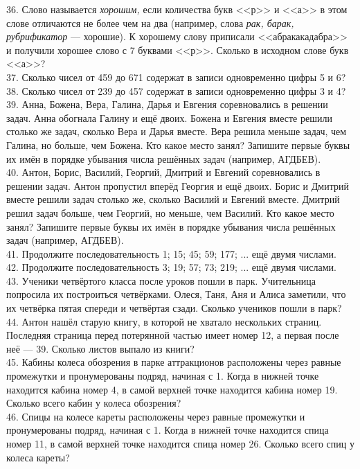 \documentclass[12pt]{article}
\begin{document}
36. Слово называется {\it хорошим,} если количества букв <<р>> и <<а>> в этом слове отличаются не более чем на два (например, слова {\it рак, барак, рубрификатор} --- хорошие). К хорошему слову приписали <<абракакадабра>> и получили хорошее слово с 7 буквами <<р>>. Сколько в исходном слове букв <<а>>?\\
37. Сколько чисел от 459 до 671 содержат в записи одновременно цифры 5 и 6?\\
38. Сколько чисел от 239 до 457 содержат в записи одновременно цифры 3 и 4?\\
39. Анна, Божена, Вера, Галина, Дарья и Евгения соревновались в решении задач. Анна обогнала Галину и ещё двоих. Божена и Евгения вместе решили столько же задач, сколько Вера и Дарья вместе. Вера решила меньше задач, чем Галина, но больше, чем Божена. Кто какое место занял? Запишите первые буквы их имён в порядке убывания числа решённых задач (например, АГДБЕВ).\\
40. Антон, Борис, Василий, Георгий, Дмитрий и Евгений соревновались в решении задач. Антон пропустил вперёд Георгия и ещё двоих. Борис и Дмитрий вместе решили задач столько же, сколько Василий и Евгений вместе. Дмитрий решил задач больше, чем Георгий, но меньше, чем Василий. Кто какое место занял? Запишите первые буквы их имён в порядке убывания числа решённых задач (например, АГДБЕВ).\\
41. Продолжите последовательность 1; 15; 45; 59; 177; ... ещё двумя числами.\\
42. Продолжите последовательность 3; 19; 57; 73; 219; ... ещё двумя числами.\\
43. Ученики четвёртого класса после уроков пошли в парк. Учительница попросила их построиться четвёрками. Олеся, Таня, Аня и Алиса заметили, что их четвёрка пятая спереди и четвёртая сзади. Сколько учеников пошли в парк?\\
44. Антон нашёл старую книгу, в которой не хватало нескольких страниц. Последняя страница перед потерянной частью имеет номер 12, а первая после неё --- 39. Сколько листов выпало из книги?\\
45. Кабины колеса обозрения в парке аттракционов расположены через равные промежутки и пронумерованы подряд, начиная с 1. Когда в нижней точке находится кабина номер 4, в самой верхней точке находится кабина номер 19. Сколько всего кабин у колеса обозрения?\\
46. Спицы на колесе кареты расположены через равные промежутки и пронумерованы подряд, начиная с 1. Когда в нижней точке находится спица номер 11, в самой верхней точке находится спица номер 26. Сколько всего спиц у колеса кареты?\\
\end{document}
